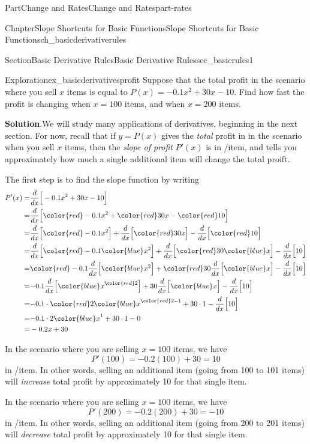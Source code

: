 \documentclass[oneside,10pt,]{tufte-book}
\newcommand{\blocktitlefont}{\relax}
\numberwithin{equation}{chapter}
\newcommand{\red}[1]{   {\color{red}   #1}   }
\newcommand{\blue}[1]{  {\color{blue}  #1}  }
\newcommand{\ddx}[1]{ \dfrac{d}{dx} \Big[ #1 \Big]  }
\newcommand{\amp}{&}
\begin{document}
\begin{partptx}{Part}{Change and Rates}{}{Change and Rates}{}{}{part-rates}
\begin{chapterptx}{Chapter}{Slope Shortcuts for Basic Functions}{}{Slope Shortcuts for Basic Functions}{}{}{ch_basicderivativerules}
\begin{sectionptx}{Section}{Basic Derivative Rules}{}{Basic Derivative Rules}{}{}{sec_basicrules1}
\begin{exploration}{Exploration}{}{ex_basicderivativesprofit}
Suppose that the total profit in the scenario where you sell \(x\) items is equal to \(P(x) = -0.1x^2 + 30x - 10\). Find how fast the profit is changing when \(x=100\) items, and when \(x=200\) items.%
\par\smallskip%
\noindent\textbf{\blocktitlefont Solution}.\hypertarget{ex_basicderivativesprofit-2}{}\quad{}We will study many applications of derivatives, beginning in the next section.  For now, recall that if \(y=P(x)\) gives the \emph{total} profit in \textdollar{} in the scenario when you sell \(x\) items, then the \emph{slope of profit} \(P'(x)\) is in \textdollar{}\slash{}item, and tells you approximately how much a single additional item will change the total proift.%
\par
The first step is to find the slope function by writing%
\begin{align*}
P'(x) = \amp \ddx{ -0.1x^2 + 30x - 10 } \\
= \amp \ddx{ \red{-0.1x^2} + \red{30x} - \red{10} } \\
= \amp \ddx{\red{-0.1x^2}} + \ddx{\red{30x}} - \ddx{ \red{10} }  \\
= \amp \ddx{ \red{-0.1}\blue{x^2} } + \ddx{ \red{30} \blue{x} } - \ddx{ 10}  \\
= \amp \red{-0.1} \ddx{ \blue{x^2} } + \red{30}\ddx{ \blue{x} } - \ddx{ 10}  \\
= \amp { -0.1} \ddx{ \blue{x}^{\red{2}} } + {30}\ddx{ \blue{x} }  - \ddx{ 10}  \\
= \amp { -0.1} \cdot{ \red{2} \blue{x}^{\red{2}-1}} + {30} \cdot{ 1 } - \ddx{ 10}  \\
= \amp { -0.1} \cdot 2 \blue{x}^{1} + {30} \cdot{ 1 } - 0 \\
= \amp -0.2 x + 30  
\end{align*}
%
\par
In the scenario where you are selling \(x=100\) items, we have%
\begin{equation*}
P'(100) = -0.2(100) + 30 = 10
\end{equation*}
in \textdollar{}\slash{}item. In other words, selling an additional item (going from 100 to 101 items) will \emph{increase} total profit by approximately 10\textdollar{} for that single item.%
\par
In the scenario where you are selling \(x=100\) items, we have%
\begin{equation*}
P'(200) = -0.2(200) + 30 = -10
\end{equation*}
in \textdollar{}\slash{}item. In other words, selling an additional item (going from 200 to 201 items) will \emph{decrease} total profit by approximately 10\textdollar{} for that single item.%

\end{exploration}
\end{sectionptx}
\end{chapterptx}
\end{partptx}
\end{document}
